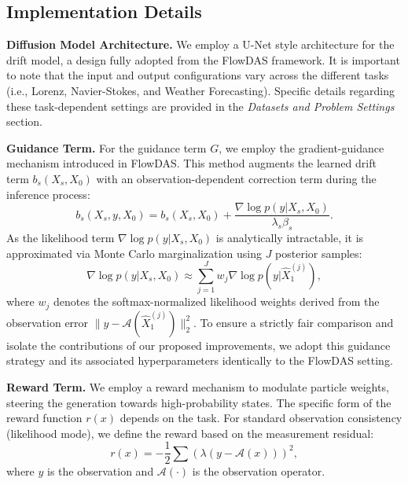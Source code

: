 \documentclass{article}
\theoremstyle{plain}
\theoremstyle{definition}
\theoremstyle{remark}
\begin{document}
\subsection{Implementation Details}

\label{app:implementation}

\textbf{Diffusion Model Architecture.} We employ a U-Net style architecture for the drift model, a design fully adopted from the FlowDAS framework. It is important to note that the input and output configurations vary across the different tasks (i.e., Lorenz, Navier-Stokes, and Weather Forecasting). Specific details regarding these task-dependent settings are provided in the \textit{Datasets and Problem Settings} section.

\textbf{Guidance Term.} For the guidance term $G$, we employ the gradient-guidance mechanism introduced in FlowDAS. This method augments the learned drift term $b_s(X_s, X_0)$ with an observation-dependent correction term during the inference process:
\begin{equation}
b_s(X_s, y, X_0) = b_s(X_s, X_0) + \frac{\nabla \log p(y|X_s, X_0)}{\lambda_s \beta_s}.
\end{equation}
As the likelihood term $\nabla \log p(y|X_s, X_0)$ is analytically intractable, it is approximated via Monte Carlo marginalization using $J$ posterior samples:
\begin{equation}
\nabla \log p(y|X_s, X_0) \approx \sum_{j=1}^{J} w_j \nabla \log p(y|\hat{X}_1^{(j)}),
\end{equation}
where $w_j$ denotes the softmax-normalized likelihood weights derived from the observation error $\|y - \mathcal{A}(\hat{X}_1^{(j)})\|^2_2$. To ensure a strictly fair comparison and isolate the contributions of our proposed improvements, we adopt this guidance strategy and its associated hyperparameters identically to the FlowDAS setting.

\textbf{Reward Term.} We employ a reward mechanism to modulate particle weights, steering the generation towards high-probability states. The specific form of the reward function $r(x)$ depends on the task. For standard observation consistency (likelihood mode), we define the reward based on the measurement residual:
\begin{equation}
r(x) = -\frac{1}{2} \sum \left( \lambda (y - \mathcal{A}(x)) \right)^2,
\end{equation}
where $y$ is the observation and $\mathcal{A}(\cdot)$ is the observation operator. 
\end{document}

